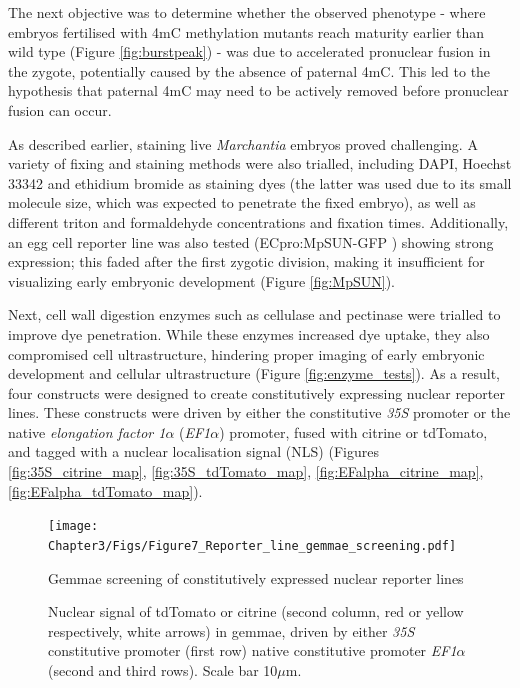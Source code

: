The next objective was to determine whether the observed phenotype - where embryos fertilised with 4mC methylation mutants reach maturity earlier than wild type (Figure \ref{fig:burstpeak}) - was due to accelerated pronuclear fusion in the zygote, potentially caused by the absence of paternal 4mC. This led to the hypothesis that paternal 4mC may need to be actively removed before pronuclear fusion can occur.

As described earlier, staining live \textit{Marchantia} embryos proved challenging. A variety of fixing and staining methods were also trialled, including DAPI, Hoechst 33342 and ethidium bromide as staining dyes (the latter was used due to its small molecule size, which was expected to penetrate the fixed embryo), as well as different triton and formaldehyde concentrations and fixation times. Additionally, an egg cell reporter line was also tested (ECpro:MpSUN-GFP \cite{RN139}) showing strong expression; this faded after the first zygotic division, making it insufficient for visualizing early embryonic development (Figure \ref{fig:MpSUN}). 

Next, cell wall digestion enzymes such as cellulase and pectinase were trialled to improve dye penetration. While these enzymes increased dye uptake, they also compromised cell ultrastructure, hindering proper imaging of early embryonic development and cellular ultrastructure (Figure \ref{fig:enzyme_tests}). As a result, four constructs were designed to create constitutively expressing nuclear reporter lines. These constructs were driven by either the constitutive \textit{35S} promoter or the native \textit{elongation factor 1$\alpha$} (\textit{EF1$\alpha$}) promoter, fused with citrine or tdTomato, and tagged with a nuclear localisation signal (NLS) (Figures \ref{fig:35S_citrine_map}, \ref{fig:35S_tdTomato_map}, \ref{fig:EFalpha_citrine_map}, \ref{fig:EFalpha_tdTomato_map}). 

\begin{figure}[htbp!] 
\centering    
    \texttt{[image: Chapter3/Figs/Figure7\_Reporter\_line\_gemmae\_screening.pdf]}
\caption{Gemmae screening of constitutively expressed nuclear reporter lines}
\label{fig:gemma:screen}
\captionsetup{font=small}
    \caption*{Nuclear signal of tdTomato or citrine (second column, red or yellow respectively, white arrows) in gemmae, driven by either \textit{35S} constitutive promoter (first row) native constitutive promoter \textit{EF1$\alpha$} (second and third rows). Scale bar 10$\mu$m.}
\end{figure}

